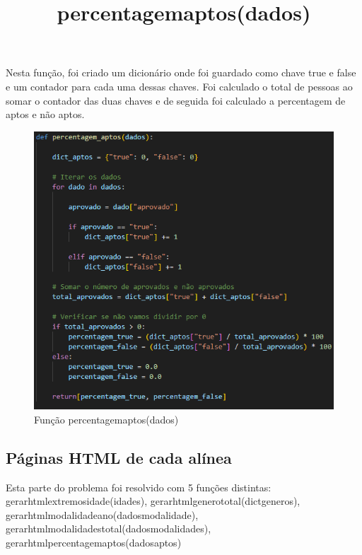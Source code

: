 \documentclass[11pt,a4paper]{report}%
\begin{document}
\title{\textbf{percentagem\textunderscore aptos(dados)}}

Nesta função, foi criado um dicionário onde foi guardado como chave true e false e um contador para cada uma dessas chaves. Foi calculado o total de pessoas ao somar o contador das duas chaves e de seguida foi calculado a percentagem de aptos e não aptos.
\begin{figure}[htbp]
\centerline{\includegraphics{percentagem_aptos.png}}
\caption{Função percentagem\textunderscore aptos(dados)}
\label{fig}
\end{figure}  



\newpage
\subsection{Páginas HTML de cada alínea} \label{subsec:indicadoresTable}
Esta parte do problema foi resolvido com 5 funções distintas: gerar\textunderscore html\textunderscore extremos\textunderscore idade(idades), gerar\textunderscore html\textunderscore genero\textunderscore total(dict\textunderscore generos), gerar\textunderscore html\textunderscore modalidade\textunderscore ano(dados\textunderscore modalidade), gerar\textunderscore html\textunderscore modalidades\textunderscore total(dados\textunderscore modalidades), gerar\textunderscore html\textunderscore percentagem\textunderscore aptos(dados\textunderscore aptos)\\
\end{document}
